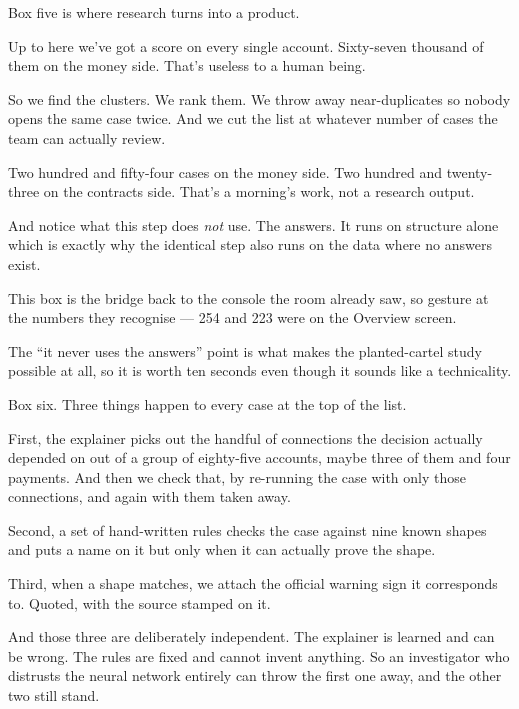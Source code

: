 \documentclass[11pt]{article}
\begin{document}

\begin{saythis}
Box five is where research turns into a product.

Up to here we've got a score on every single account. Sixty-seven thousand of
them on the money side. That's useless to a human being.

So we find the clusters. We rank them. We throw away near-duplicates so nobody
opens the same case twice. And we cut the list at whatever number of cases the
team can actually review.

Two hundred and fifty-four cases on the money side. Two hundred and twenty-three
on the contracts side. That's a morning's work, not a research output.

And notice what this step does \emph{not} use. The answers. It runs on
structure alone \bt which is exactly why the identical step also runs on the
data where no answers exist.
\end{saythis}

\begin{means}
This box is the bridge back to the console the room already saw, so gesture at
the numbers they recognise --- 254 and 223 were on the Overview screen.

The ``it never uses the answers'' point is what makes the planted-cartel study
possible at all, so it is worth ten seconds even though it sounds like a
technicality.
\end{means}


\begin{saythis}
Box six. Three things happen to every case at the top of the list.

First, the explainer picks out the handful of connections the decision actually
depended on \bt out of a group of eighty-five accounts, maybe three of them and
four payments. And then we check that, by re-running the case with only those
connections, and again with them taken away.

Second, a set of hand-written rules checks the case against nine known shapes
and puts a name on it \bt but only when it can actually prove the shape.

Third, when a shape matches, we attach the official warning sign it corresponds
to. Quoted, with the source stamped on it.

And those three are deliberately independent. The explainer is learned and can
be wrong. The rules are fixed and cannot invent anything. So an investigator
who distrusts the neural network entirely can throw the first one away, and the
other two still stand.
\end{saythis}
\end{document}
